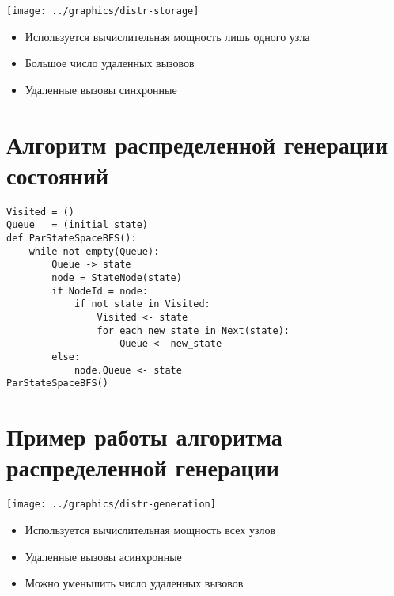 \documentclass[12pt]{article}
\begin{document}
\begin{minipage}[m]{0.5\linewidth}
  \texttt{[image: ../graphics/distr-storage]}
\end{minipage}
\begin{minipage}[m]{0.5\linewidth}
  \begin{flushleft}
    \begin{itemize}
    \item Используется вычислительная мощность лишь одного узла
    \item Большое число удаленных вызовов
    \item Удаленные вызовы синхронные
    \end{itemize}
  \end{flushleft}
\end{minipage}

\section{Алгоритм распределенной генерации состояний}
\label{sec:distr-generation}

\begin{lstlisting}[style=pseudocode]
Visited = ()
Queue   = (initial_state)
def ParStateSpaceBFS():
    while not empty(Queue):
        Queue -> state
        node = StateNode(state)
        if NodeId = node:
            if not state in Visited:
                Visited <- state
                for each new_state in Next(state):
                    Queue <- new_state
        else:
            node.Queue <- state
ParStateSpaceBFS()
\end{lstlisting}

\section{Пример работы алгоритма распределенной генерации}
\label{sec:distr-generation2}

\begin{minipage}[m]{0.55\linewidth}
  \texttt{[image: ../graphics/distr-generation]}
\end{minipage}
\begin{minipage}[m]{0.45\linewidth}
  \begin{flushleft}
    \begin{itemize}
    \item Используется вычислительная мощность всех узлов
    \item Удаленные вызовы асинхронные
    \item Можно уменьшить число удаленных вызовов
    \end{itemize}
  \end{flushleft}
\end{minipage}
\end{document}
